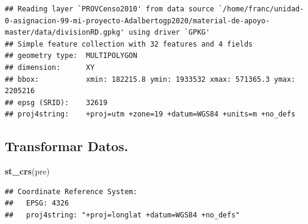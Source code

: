 \documentclass[11pt,]{article}
\newenvironment{Shaded}{\begin{snugshade}}{\end{snugshade}}
\newcommand{\KeywordTok}[1]{\textcolor[rgb]{0.13,0.29,0.53}{\textbf{#1}}}
\newcommand{\DataTypeTok}[1]{\textcolor[rgb]{0.13,0.29,0.53}{#1}}
\newcommand{\DecValTok}[1]{\textcolor[rgb]{0.00,0.00,0.81}{#1}}
\newcommand{\StringTok}[1]{\textcolor[rgb]{0.31,0.60,0.02}{#1}}
\newcommand{\OperatorTok}[1]{\textcolor[rgb]{0.81,0.36,0.00}{\textbf{#1}}}
\newcommand{\NormalTok}[1]{#1}
\begin{document}
\begin{verbatim}
## Reading layer `PROVCenso2010' from data source `/home/franc/unidad-0-asignacion-99-mi-proyecto-Adalbertogp2020/material-de-apoyo-master/data/divisionRD.gpkg' using driver `GPKG'
## Simple feature collection with 32 features and 4 fields
## geometry type:  MULTIPOLYGON
## dimension:      XY
## bbox:           xmin: 182215.8 ymin: 1933532 xmax: 571365.3 ymax: 2205216
## epsg (SRID):    32619
## proj4string:    +proj=utm +zone=19 +datum=WGS84 +units=m +no_defs
\end{verbatim}

\subsection{Transformar Datos.}\label{transformar-datos.}

\begin{Shaded}
\begin{Highlighting}[]
\KeywordTok{st_crs}\NormalTok{(pre)}
\end{Highlighting}
\end{Shaded}

\begin{verbatim}
## Coordinate Reference System:
##   EPSG: 4326 
##   proj4string: "+proj=longlat +datum=WGS84 +no_defs"
\end{verbatim}

\begin{Shaded}
\end{Shaded}
\end{document}
